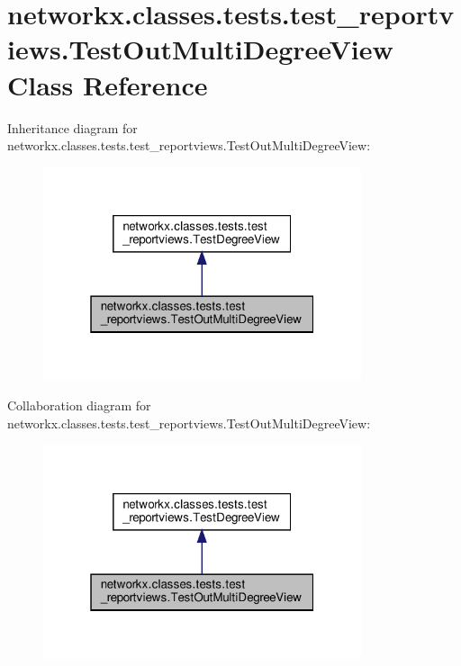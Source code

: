 \hypertarget{classnetworkx_1_1classes_1_1tests_1_1test__reportviews_1_1TestOutMultiDegreeView}{}\section{networkx.\+classes.\+tests.\+test\+\_\+reportviews.\+Test\+Out\+Multi\+Degree\+View Class Reference}
\label{classnetworkx_1_1classes_1_1tests_1_1test__reportviews_1_1TestOutMultiDegreeView}


Inheritance diagram for networkx.\+classes.\+tests.\+test\+\_\+reportviews.\+Test\+Out\+Multi\+Degree\+View\+:
\nopagebreak
\begin{figure}[H]
\begin{center}
\leavevmode
\includegraphics[width=265pt]{classnetworkx_1_1classes_1_1tests_1_1test__reportviews_1_1TestOutMultiDegreeView__inherit__graph}
\end{center}
\end{figure}


Collaboration diagram for networkx.\+classes.\+tests.\+test\+\_\+reportviews.\+Test\+Out\+Multi\+Degree\+View\+:
\nopagebreak
\begin{figure}[H]
\begin{center}
\leavevmode
\includegraphics[width=265pt]{classnetworkx_1_1classes_1_1tests_1_1test__reportviews_1_1TestOutMultiDegreeView__coll__graph}
\end{center}
\end{figure}
